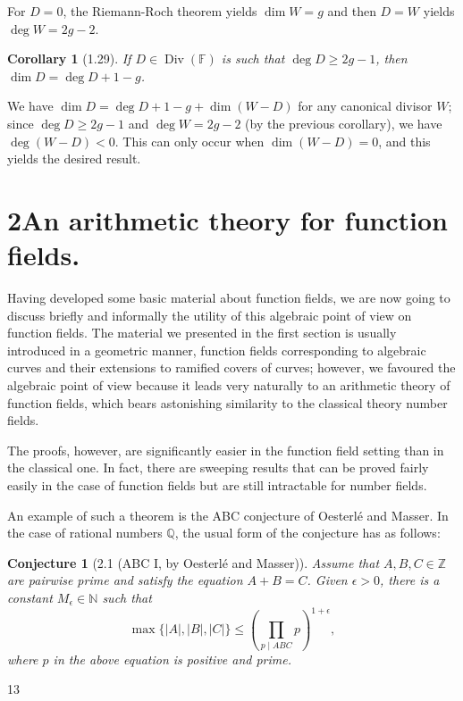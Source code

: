 \documentclass[11pt]{article}
\makeatletter
\theoremstyle{scplain}
\newtheorem*{corollary}{Corollary}
\newtheorem*{conjecture}{Conjecture}
\renewenvironment{proof}[1][\proofname]{%
  \par\pushQED{\qed}\normalfont\topsep6\p@\@plus6\p@\relax
  \trivlist\item[\hskip\labelsep\scshape #1\@addpunct{.}]\ignorespaces}%
  {\popQED\endtrivlist\@endpefalse}
\DeclareMathOperator{\Div}{Div}
\makeatother
\begin{document}
\begin{proof}
For $D=0$, the Riemann-Roch theorem yields $\dim W=g$ and then $D=W$ yields
$\deg W=2g-2$.
\end{proof}

\begin{corollary}[1.29]
If $D \in \Div(\mathbb{F})$ is such that $\deg D \geq 2g-1$, then
$\dim D=\deg D+1-g$.
\end{corollary}

\begin{proof}
We have $\dim D=\deg D+1-g+\dim(W-D)$ for any canonical divisor $W$; since
$\deg D \geq 2g-1$ and $\deg W=2g-2$ (by the previous corollary), we have
$\deg(W-D)<0$. This can only occur when $\dim(W-D)=0$, and this yields the
desired result.
\end{proof}

\section*{2\quad An arithmetic theory for function fields.}

Having developed some basic material about function fields, we are now going to
discuss briefly and informally the utility of this algebraic point of view on
function fields. The material we presented in the first section is usually
introduced in a geometric manner, function fields corresponding to algebraic
curves and their extensions to ramified covers of curves; however, we favoured
the algebraic point of view because it leads very naturally to an arithmetic
theory of function fields, which bears astonishing similarity to the classical
theory number fields.

The proofs, however, are significantly easier in the function field setting
than in the classical one. In fact, there are sweeping results that can be
proved fairly easily in the case of function fields but are still intractable
for number fields.

An example of such a theorem is the ABC conjecture of Oesterl\'e and Masser. In
the case of rational numbers $\mathbb{Q}$, the usual form of the conjecture has
as follows:

\begin{conjecture}[2.1 (ABC I, by Oesterl\'e and Masser)]
Assume that $A,B,C \in \mathbb{Z}$ are pairwise prime and satisfy the equation
$A+B=C$. Given $\epsilon>0$, there is a constant $M_\epsilon \in \mathbb{N}$
such that
\[
  \max\{|A|,|B|,|C|\}
    \leq \left(\prod_{p\mid ABC}p\right)^{1+\epsilon},
\]
where $p$ in the above equation is positive and prime.
\end{conjecture}

\begin{center}13\end{center}
\end{document}

